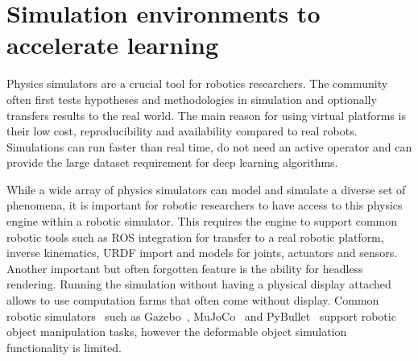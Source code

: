 \documentclass[\home/main.tex]{subfiles}
\begin{document}

\section{Simulation environments to accelerate learning} \label{sec:lit_simulation}

Physics simulators are a crucial tool for robotics researchers. The community often first tests hypotheses and methodologies in simulation and optionally transfers results to the real world. The main reason for using virtual platforms is their low cost, reproducibility and availability compared to real robots. Simulations can run faster than real time, do not need an active operator and can provide the large dataset requirement for deep learning algorithms.

While a wide array of physics simulators can model and simulate a diverse set of phenomena, it is important for robotic researchers to have access to this physics engine within a robotic simulator. This requires the engine to support common robotic tools such as ROS integration for transfer to a real robotic platform, inverse kinematics, URDF import and models for joints, actuators and sensors. Another important but often forgotten feature is the ability for headless rendering. Running the simulation without having a physical display attached allows to use computation farms that often come without display. Common robotic simulators~\autocite{review paper robotic simulators} such as Gazebo~\autocite{gazebo}, MuJoCo~\autocite{mujoco} and PyBullet~\autocite{pybullet} support robotic object manipulation tasks, however the deformable object simulation functionality is limited.
\end{document}
